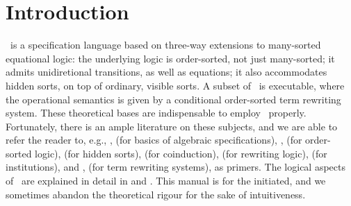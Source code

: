 \documentclass[a4paper]{memoir}
\begin{document}
\clearpage
\newpage
\pagestyle{headings}
\tableofcontents
\clearpage

\pagestyle{ruled}
\chapter{Introduction}

\cafeobj~is a specification language based on three-way extensions to
many-sorted equational logic: the underlying logic is
order-sorted, not just many-sorted; it admits unidiretional transitions,
as well as equations; it also accommodates hidden sorts, on top of
ordinary, visible sorts. A subset of \cafeobj~is executable, where the
operational semantics is given by a conditional order-sorted term rewriting
system. These theoretical bases are indispensable to employ \cafeobj~properly.
Fortunately, there is an ample literature on these subjects, and we are able
to refer the reader to, e.g., \cite{e-m85}, \cite{m-g82} (for basics of
algebraic specifications), \cite{osa}, \cite{osa-survey} (for order-sorted
logic), \cite{hsa} (for hidden sorts), \cite{eatcs-coalg} (for coinduction),
\cite{rew-logic} (for rewriting
logic), \cite{institution} (for institutions), and \cite{trs-eatcs},
\cite{trs-handbook} (for term rewriting systems), as primers.
The logical aspects of \cafeobj~are explained in detail in \cite{razvan96-1}
and \cite{cafeobj-rep}. This manual is for the initiated, and we sometimes
abandon the theoretical rigour for the sake of intuitiveness.
\end{document}
